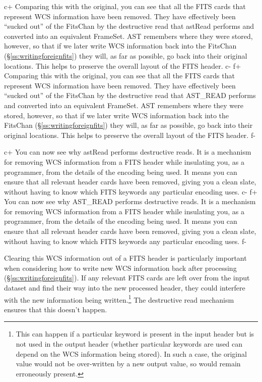 \documentclass[twoside,11pt]{article}
\newcommand{\secref}[1]{\S\ref{#1}}
\newcommand{\secref}[1]{\ref{#1}}
\begin{document}
c+
Comparing this with the original, you can see that all the FITS cards
that represent WCS information have been removed. They have
effectively been ``sucked out'' of the FitsChan by the destructive
read that astRead performs and converted into an equivalent
FrameSet. AST remembers where they were stored, however, so that if we
later write WCS information back into the FitsChan
(\secref{ss:writingforeignfits}) they will, as far as possible, go
back into their original locations. This helps to preserve the overall
layout of the FITS header.
c-
f+
Comparing this with the original, you can see that all the FITS cards
that represent WCS information have been removed. They have
effectively been ``sucked out'' of the FitsChan by the destructive
read that AST\_READ performs and converted into an equivalent
FrameSet. AST remembers where they were stored, however, so that if we
later write WCS information back into the FitsChan
(\secref{ss:writingforeignfits}) they will, as far as possible, go
back into their original locations.  This helps to preserve the
overall layout of the FITS header.
f-

c+
You can now see why astRead performs destructive reads. It is a
mechanism for removing WCS information from a FITS header while
insulating you, as a programmer, from the details of the encoding
being used. It means you can ensure that all relevant header cards
have been removed, giving you a clean slate, without having to know
which FITS keywords any particular encoding uses.
c-
f+
You can now see why AST\_READ performs destructive reads. It is a
mechanism for removing WCS information from a FITS header while
insulating you, as a programmer, from the details of the encoding
being used. It means you can ensure that all relevant header cards
have been removed, giving you a clean slate, without having to know
which FITS keywords any particular encoding uses.
f-

Clearing this WCS information out of a FITS header is particularly
important when considering how to write new WCS information back after
processing (\secref{ss:writingforeignfits}). If any relevant FITS
cards are left over from the input dataset and find their way into the
new processed header, they could interfere with the new information
being written.\footnote{This can happen if a particular keyword is
present in the input header but is not used in the output header
(whether particular keywords are used can depend on the WCS
information being stored). In such a case, the original value would
not be over-written by a new output value, so would remain erroneously
present.} The destructive read mechanism ensures that this doesn't
happen.
\end{document}

